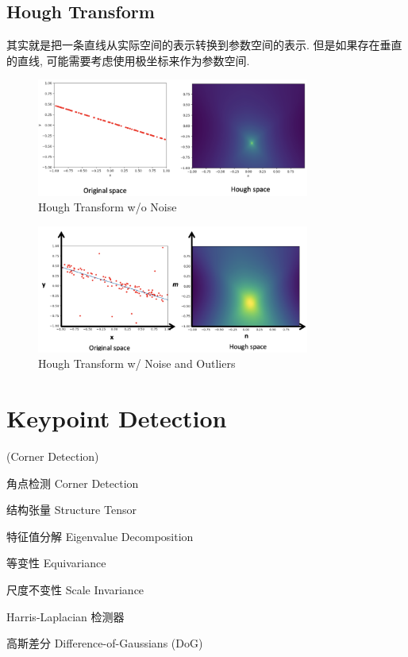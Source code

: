 \documentclass[lang=cn,10pt,green]{elegantbook}
\begin{document}
\newpage
\section{Hough Transform}

其实就是把一条直线从实际空间的表示转换到参数空间的表示. 但是如果存在垂直的直线, 可能需要考虑使用极坐标来作为参数空间.

\begin{figure}[htbp]
    \centering
    \includegraphics[width=0.8\textwidth]{figures/hough1.png}
    \caption{Hough Transform w/o Noise}
\end{figure}

\begin{figure}[htbp]
    \centering
    \includegraphics[width=0.8\textwidth]{figures/hough2.png}
    \caption{Hough Transform w/ Noise and Outliers}
\end{figure}




\chapter{Keypoint Detection}
(Corner Detection)

\begin{introduction}[Keywords]
    \item 角点检测 Corner Detection
    \item 结构张量 Structure Tensor
    \item 特征值分解 Eigenvalue Decomposition
    \item 等变性 Equivariance
    \item 尺度不变性 Scale Invariance
    \item Harris-Laplacian 检测器
    \item 高斯差分 Difference-of-Gaussians (DoG)
\end{introduction}
\end{document}
